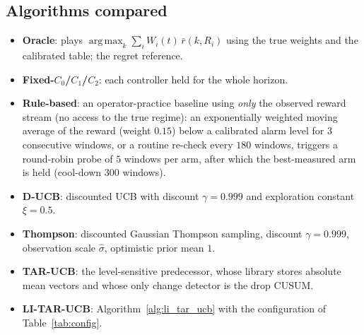 \documentclass[11pt]{article}
\DeclareMathOperator*{\argmax}{arg\,max}
\begin{document}
\subsection{Algorithms compared}
\label{subsec:baselines}

\begin{itemize}
\item \textbf{Oracle}: plays $\argmax_k \sum_i W_i(t)\,\bar r(k,R_i)$ using the true weights and the calibrated table; the regret reference.
\item \textbf{Fixed-$C_0$/$C_1$/$C_2$}: each controller held for the whole horizon.
\item \textbf{Rule-based}: an operator-practice baseline using \emph{only} the observed reward stream (no access to the true regime): an exponentially weighted moving average of the reward (weight $0.15$) below a calibrated alarm level for $3$ consecutive windows, or a routine re-check every $180$ windows, triggers a round-robin probe of $5$ windows per arm, after which the best-measured arm is held (cool-down $300$ windows).
\item \textbf{D-UCB}: discounted UCB with discount $\gamma=0.999$ and exploration constant $\xi=0.5$.
\item \textbf{Thompson}: discounted Gaussian Thompson sampling, discount $\gamma=0.999$, observation scale $\widehat\sigma$, optimistic prior mean $1$.
\item \textbf{TAR-UCB}: the level-sensitive predecessor, whose library stores absolute mean vectors and whose only change detector is the drop CUSUM.
\item \textbf{LI-TAR-UCB}: Algorithm~\ref{alg:li_tar_ucb} with the configuration of Table~\ref{tab:config}.
\end{itemize}
\end{document}
